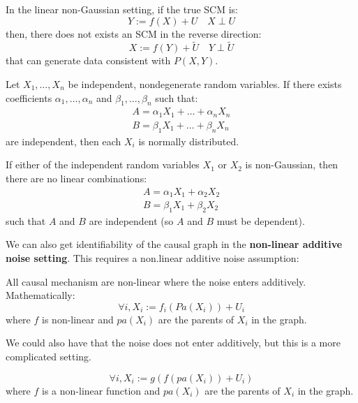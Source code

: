 \begin{definition}
    In the linear non-Gaussian setting, if the true SCM is:
    \begin{equation*}
        Y := f(X) + U \quad X \perp U
    \end{equation*}
    then, there does not exists an SCM in the reverse direction:
    \begin{equation*}
        X := f(Y) + \tilde{U} \quad Y \perp \tilde{U}
    \end{equation*}
    that can generate data consistent with $P(X, Y)$.
\end{definition}

\begin{theorem}
    Let $X_1, \dots, X_n$ be independent, nondegenerate random variables. If there
    exists coefficients $\alpha_1, \dots, \alpha_n$ and $\beta_1, \dots, \beta_n$ such that:
    \begin{equation*}
        \begin{split}
            A = \alpha_1X_1 + \dots + \alpha_nX_n \\
            B = \beta_1X_1 + \dots + \beta_nX_n
        \end{split}
    \end{equation*}
    are independent, then each $X_i$ is normally distributed.
\end{theorem}
\begin{corollary}
    If either of the independent random variables $X_1$ or $X_2$ is non-Gaussian,
    then there are no linear combinations:
    \begin{equation}
        \begin{split}
            A = \alpha_1X_1 + \alpha_2X_2 \\
            B = \beta_1X_1 + \beta_2X_2
        \end{split}
    \end{equation}
    such that $A$ and $B$ are independent (so $A$ and $B$ must be dependent).
\end{corollary}
We can also get identifiability of the causal graph in the \textbf{non-linear additive
    noise setting}. This requires a non.linear additive noise assumption:
\begin{definition}
    All causal mechanism are non-linear where the noise enters additively.
    Mathematically:
    \begin{equation}
        \forall i, X_i := f_i(Pa(X_i)) + U_i
    \end{equation}
    where $f$ is non-linear and $pa(X_i)$ are the parents of $X_i$ in the graph.
\end{definition}
We could also have that the noise does not enter additively, but this is a more
complicated setting.
\begin{definition}
    \begin{equation}
        \forall i, X_i := g(f(pa(X_i)) + U_i)
    \end{equation}
    where $f$ is a non-linear function and $pa(X_i)$ are the parents of $X_i$ in
    the graph.
\end{definition}
